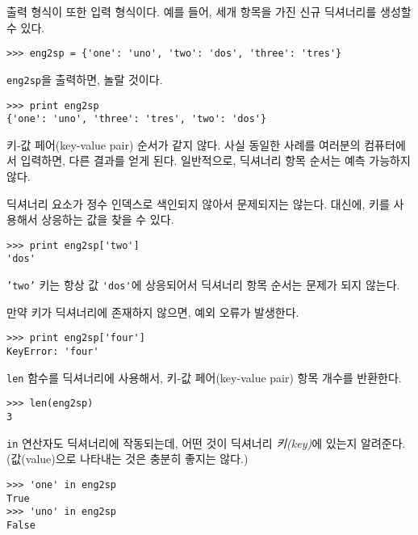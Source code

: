 출력 형식이 또한 입력 형식이다. 
예를 들어, 세개 항목을 가진 신규 딕셔너리를 생성할 수 있다.

\beforeverb
\begin{verbatim}
>>> eng2sp = {'one': 'uno', 'two': 'dos', 'three': 'tres'}
\end{verbatim}
\afterverb
%

{\tt eng2sp}을 출력하면, 놀랄 것이다.

\beforeverb
\begin{verbatim}
>>> print eng2sp
{'one': 'uno', 'three': 'tres', 'two': 'dos'}
\end{verbatim}
\afterverb
%

키-값 페어(key-value pair) 순서가 같지 않다. 
사실 동일한 사례를 여러분의 컴퓨터에서 입력하면, 다른 결과를 얻게 된다.
일반적으로, 딕셔너리 항목 순서는 예측 가능하지 않다.

딕셔너리 요소가 정수 인덱스로 색인되지 않아서 문제되지는 않는다.
대신에, 키를 사용해서 상응하는 값을 찾을 수 있다.

\beforeverb
\begin{verbatim}
>>> print eng2sp['two']
'dos'
\end{verbatim}
\afterverb
%

{\tt 'two'} 키는 항상 값 \verb"'dos'"에 상응되어서 딕셔너리 항목 순서는 문제가 되지 않는다.

만약 키가 딕셔너리에 존재하지 않으면, 예외 오류가 발생한다.


\beforeverb
\begin{verbatim}
>>> print eng2sp['four']
KeyError: 'four'
\end{verbatim}
\afterverb
%

{\tt len} 함수를 딕셔너리에 사용해서, 키-값 페어(key-value pair) 항목 개수를 반환한다.


\beforeverb
\begin{verbatim}
>>> len(eng2sp)
3
\end{verbatim}
\afterverb
%

{\tt in} 연산자도 딕셔너리에 작동되는데, 어떤 것이 딕셔너리 \emph{키(key)}에 있는지 알려준다. (값(value)으로 나타내는 것은 충분히 좋지는 않다.)


\beforeverb
\begin{verbatim}
>>> 'one' in eng2sp
True
>>> 'uno' in eng2sp
False
\end{verbatim}
\afterverb
%

